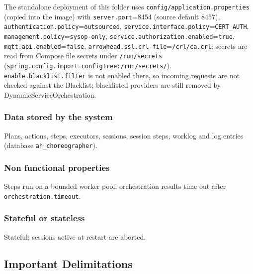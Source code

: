 \documentclass[a4paper]{arrowhead}
\begin{document}
The standalone deployment of this folder uses \texttt{config/\allowbreak{}application.\allowbreak{}properties} (copied into the image) with \texttt{server.\allowbreak{}port}=8454 (source default 8457), \texttt{authentication.\allowbreak{}policy}=\texttt{outsourced}, \texttt{service.\allowbreak{}interface.\allowbreak{}policy}=\texttt{CERT\_AUTH}, \texttt{management.\allowbreak{}policy}=\texttt{sysop-\allowbreak{}only}, \texttt{service.\allowbreak{}authorization.\allowbreak{}enabled}=\texttt{true}, \texttt{mqtt.\allowbreak{}api.\allowbreak{}enabled}=\texttt{false}, \texttt{arrowhead.\allowbreak{}ssl.\allowbreak{}crl-\allowbreak{}file}=\texttt{/\allowbreak{}crl/\allowbreak{}ca.\allowbreak{}crl}; secrets are read from Compose file secrets under \texttt{/\allowbreak{}run/\allowbreak{}secrets} (\texttt{spring.\allowbreak{}config.\allowbreak{}import=\allowbreak{}configtree:\allowbreak{}/\allowbreak{}run/\allowbreak{}secrets/}). \texttt{enable.\allowbreak{}blacklist.\allowbreak{}filter} is not enabled there, so incoming requests are not checked against the Blacklist; blacklisted providers are still removed by Dynamic\allowbreak{}Service\allowbreak{}Orchestration.

\subsubsection{Data stored by the system}

Plans, actions, steps, executors, sessions, session steps, worklog and log entries (database \texttt{ah\_\allowbreak{}choreographer}).

\subsubsection{Non functional properties}

Steps run on a bounded worker pool; orchestration results time out after \texttt{orchestration.\allowbreak{}timeout}.

\subsubsection{Stateful or stateless}

Stateful; sessions active at restart are aborted.

\subsection{Important Delimitations}
\label{sec:delimitations}
\end{document}
